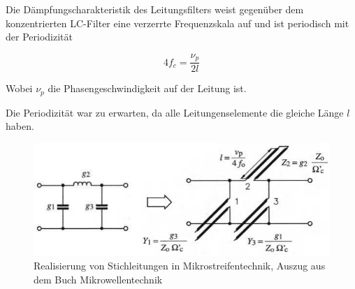 Die  D\"ampfungscharakteristik  des   Leitungsfilters  weist  gegen\"uber  dem
konzentrierten  LC-Filter eine verzerrte Frequenzskala auf und ist  periodisch
mit der Periodizit\"at

\begin{equation}
    4f_c = \frac{\nu_p}{2l}
\end{equation}

Wobei $\nu_p$ die Phasengeschwindigkeit auf der Leitung ist.

Die Periodizit\"at war  zu  erwarten,  da  alle Leitungenselemente die gleiche
L\"ange $l$ haben.

\begin{figure}[h!]
    \centering
    \includegraphics[width=\imagewidth]{images/LC-zu-Leitungsfilter}
    \caption{Realisierung von Stichleitungen in Mikrostreifentechnik, Auszug aus dem Buch Mikrowellentechnik\cite[p.~26]{ref:baechtold}}
    \label{fig:LC-zu-Leitungsfilter}
\end{figure}

